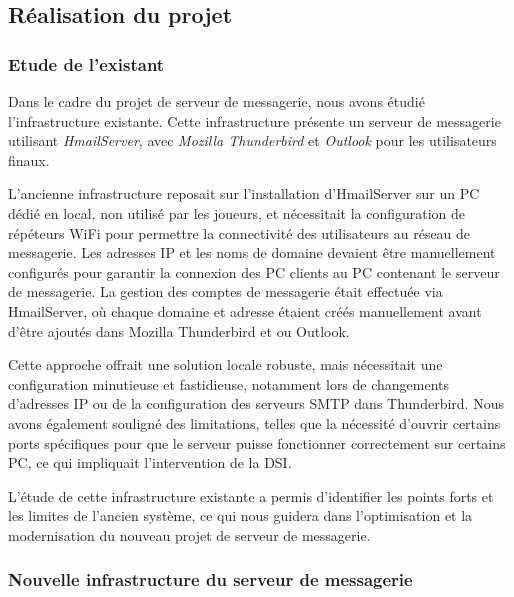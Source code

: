 

\subsection{Réalisation du projet}

\subsubsection{Etude de l'existant}

Dans le cadre du projet de serveur de messagerie, nous avons étudié l'infrastructure existante.
Cette infrastructure présente un serveur de messagerie utilisant \textit{HmailServer}, avec \textit{Mozilla Thunderbird} et \textit{Outlook} pour les utilisateurs finaux.

L'ancienne infrastructure reposait sur l'installation d'HmailServer sur un PC dédié en local, non utilisé par les joueurs, et nécessitait la configuration de répéteurs WiFi pour permettre la connectivité des utilisateurs au réseau de messagerie.
Les adresses IP et les noms de domaine devaient être manuellement configurés pour garantir la connexion des PC clients au PC contenant le serveur de messagerie.
La gestion des comptes de messagerie était effectuée via HmailServer, où chaque domaine et adresse étaient créés manuellement avant d'être ajoutés dans Mozilla Thunderbird et ou Outlook.

Cette approche offrait une solution locale robuste, mais nécessitait une configuration minutieuse et fastidieuse, notamment lors de changements d'adresses IP ou de la configuration des serveurs SMTP dans Thunderbird.
Nous avons également souligné des limitations, telles que la nécessité d'ouvrir certains ports spécifiques pour que le serveur puisse fonctionner correctement sur certains PC, ce qui impliquait l'intervention de la DSI.

L'étude de cette infrastructure existante a permis d'identifier les points forts et les limites de l'ancien système, ce qui nous guidera dans l'optimisation et la modernisation du nouveau projet de serveur de messagerie.


\subsubsection{Nouvelle infrastructure du serveur de messagerie}

